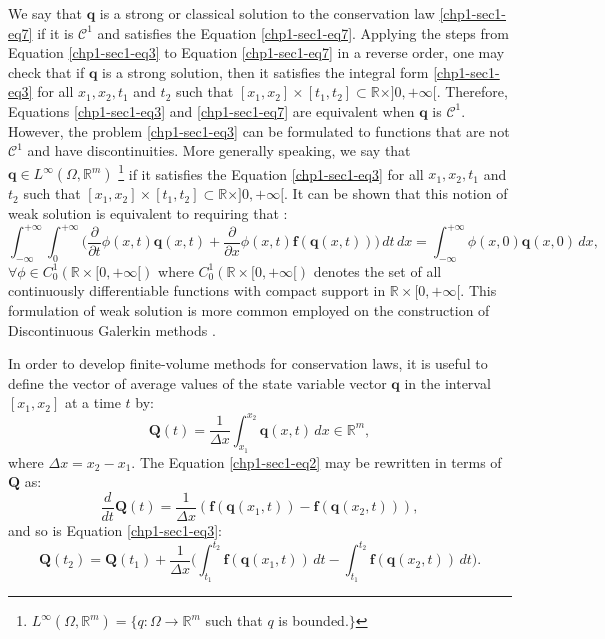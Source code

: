 We say that $\mathbf{q}$ is a strong or classical solution to the conservation law \eqref{chp1-sec1-eq7}
if it is $\mathcal{C}^1$ and satisfies the Equation \eqref{chp1-sec1-eq7}.
Applying the steps from Equation \eqref{chp1-sec1-eq3} to Equation \eqref{chp1-sec1-eq7}
in a reverse order, one may check that if $\mathbf{q}$ is a strong solution,
then it satisfies the integral form \eqref{chp1-sec1-eq3} for all $x_1, x_2, t_1$ and $t_2$ such that
$[x_1, x_2] \times [t_1, t_2] \subset \mathbb{R}\times ]0, +\infty[$. 
Therefore, Equations \eqref{chp1-sec1-eq3} and \eqref{chp1-sec1-eq7} are
equivalent when $\mathbf{q}$ is $\mathcal{C}^1$.
However, the problem \eqref{chp1-sec1-eq3} can be formulated
to functions that are not $\mathcal{C}^1$ and have discontinuities.
More generally speaking, we say that $\mathbf{q} \in L^{\infty}(\Omega, \mathbb{R}^m)$ 
\footnote{$L^{\infty}(\Omega, \mathbb{R}^m) = \{q: \Omega \to \mathbb{R}^m$
such that $q$ is bounded.$\}$}
if it satisfies the Equation 
\eqref{chp1-sec1-eq3} for all $x_1, x_2, t_1$ and $t_2$ such that
$[x_1, x_2] \times [t_1, t_2] \subset \mathbb{R}\times ]0, +\infty[$.
It can be shown that this notion of weak solution is equivalent to requiring that \citep{leveque:1990}:
\begin{equation}
	\label{chp1-sec1-eq8}
	\int_{-\infty}^{+\infty} \int_{0}^{+\infty} \bigg(
	\frac{\partial}{\partial t} \phi(x, t)\mathbf{q}(x, t) +
	\frac{\partial}{\partial x} \phi(x ,t)\mathbf{f}(\mathbf{q}(x, t)) 
	\bigg)\,dt \,dx = 
	\int_{-\infty}^{+\infty} \phi(x, 0)\mathbf{q}(x, 0) \,dx  , \quad
\end{equation}
$\forall \phi \in C_{0}^{1}(\mathbb{R}\times[0, +\infty[)$
where $C_{0}^{1}(\mathbb{R}\times[0, +\infty[)$ denotes the set
of all continuously differentiable functions with compact support 
in $\mathbb{R}\times[0, +\infty[$. This formulation of weak solution
is more common employed on the construction of Discontinuous Galerkin
methods \citep{nair:2011}.

In order to develop finite-volume methods for conservation laws, it is useful to define the vector of
average values of the state variable vector $\mathbf{q}$ in the interval $[x_1, x_2]$ at a time $t$ by:
\begin{equation}
	\label{chp1-sec1-eq9}
	\mathbf{Q}(t) = \frac{1}{\Delta x}
	\int_{x_1}^{x_2} \mathbf{q}(x,t) \,dx
	\in \mathbb{R}^m,
\end{equation}
where $\Delta x = x_2 - x_1$. The Equation \eqref{chp1-sec1-eq2} may be  rewritten in terms of $\mathbf{Q}$ as:
\begin{equation}
        \label{chp1-sec1-eq10}
	\frac{d}{dt} \mathbf{Q}(t) = \frac{1}{\Delta x} 
	(\mathbf{f}(\mathbf{q}(x_1,t)) - \mathbf{f}(\mathbf{q}(x_2,t))) ,
\end{equation}
and so is Equation \eqref{chp1-sec1-eq3}:
\begin{equation}
        \label{chp1-sec1-eq11}
	\mathbf{Q}(t_2) =  \mathbf{Q}(t_1) + 
	\frac{1}{\Delta x}\bigg( \int_{t_1}^{t_2} 
	\mathbf{f}(\mathbf{q}(x_1, t)) \,dt - 
	\int_{t_1}^{t_2}\mathbf{f}(\mathbf{q}(x_2, t)) \,dt \bigg).
\end{equation}


